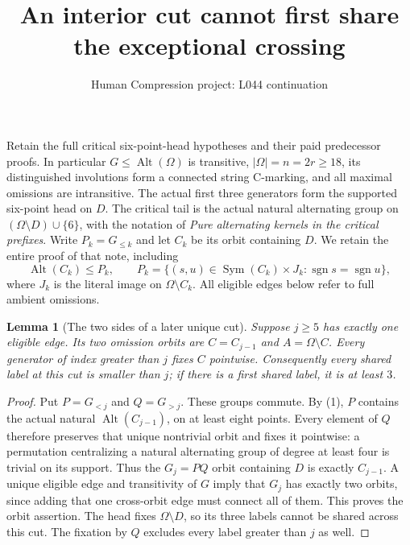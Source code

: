 \documentclass[11pt,a4paper]{article}
\title{An interior cut cannot first share the exceptional crossing}
\author{Human Compression project: L044 continuation}
\date{}
\newtheorem{lemma}{Lemma}
\newcommand{\Alt}{\operatorname{Alt}}
\begin{document}
\maketitle
Retain the full critical six-point-head hypotheses and their paid
predecessor proofs. In particular $G\leq\Alt(\Omega)$ is transitive,
$|\Omega|=n=2r\geq18$, its distinguished involutions form a connected
string C-marking, and all maximal omissions are intransitive.
The actual first three generators form the supported six-point head
on $D$. The critical tail is the actual natural alternating group
on $(\Omega\setminus D)\cup\{6\}$, with the notation of
\emph{Pure alternating kernels in the critical prefixes}.
Write $P_k=G_{\leq k}$ and let $C_k$ be its orbit containing $D$.
We retain the entire proof of that note, including
\[
 \Alt(C_k)\leq P_k,\qquad
 P_k=\{(s,u)\in\operatorname{Sym}(C_k)\times J_k:
                         \operatorname{sgn}s=\operatorname{sgn}u\},
                                                        \tag{1}
\]
where $J_k$ is the literal image on $\Omega\setminus C_k$.
All eligible edges below refer to full ambient omissions.

\begin{lemma}[The two sides of a later unique cut]\label{sides}
Suppose $j\geq5$ has exactly one eligible edge. Its two omission
orbits are $C=C_{j-1}$ and $A=\Omega\setminus C$.
Every generator of index greater than $j$ fixes $C$ pointwise.
Consequently every shared label at this cut is smaller than $j$;
if there is a first shared label, it is at least $3$.
\end{lemma}
\begin{proof}
Put $P=G_{<j}$ and $Q=G_{>j}$. These groups commute.
By (1), $P$ contains the actual natural $\Alt(C_{j-1})$,
on at least eight points. Every element of $Q$ therefore preserves
that unique nontrivial orbit and fixes it pointwise: a permutation
centralizing a natural alternating group of degree at least four
is trivial on its support. Thus the $G_j=PQ$ orbit containing
$D$ is exactly $C_{j-1}$. A unique eligible edge and transitivity
of $G$ imply that $G_j$ has exactly two orbits, since adding that
one cross-orbit edge must connect all of them. This proves the
orbit assertion. The head fixes $\Omega\setminus D$, so its three
labels cannot be shared across this cut. The fixation by $Q$
excludes every label greater than $j$ as well.
\end{proof}
\end{document}

